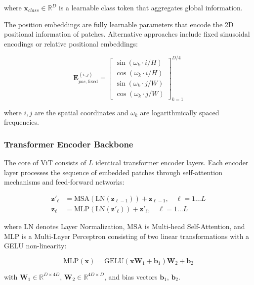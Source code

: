 where $\mathbf{x}_{class} \in \mathbb{R}^D$ is a learnable class token that aggregates global information.

The position embeddings are fully learnable parameters that encode the 2D positional information of patches. Alternative approaches include fixed sinusoidal encodings or relative positional embeddings:

\begin{equation}
\mathbf{E}^{(i,j)}_{pos, \text{fixed}} = \begin{bmatrix} \sin(\omega_k \cdot i/H) \\ \cos(\omega_k \cdot i/H) \\ \sin(\omega_k \cdot j/W) \\ \cos(\omega_k \cdot j/W) \end{bmatrix}_{k=1}^{D/4}
\end{equation}

where $i,j$ are the spatial coordinates and $\omega_k$ are logarithmically spaced frequencies.

\subsubsection{Transformer Encoder Backbone}

The core of ViT consists of $L$ identical transformer encoder layers. Each encoder layer processes the sequence of embedded patches through self-attention mechanisms and feed-forward networks:

\begin{align}
\mathbf{z}'_{\ell} &= \text{MSA}(\text{LN}(\mathbf{z}_{\ell-1})) + \mathbf{z}_{\ell-1}, \quad \ell = 1 \ldots L\\
\mathbf{z}_{\ell} &= \text{MLP}(\text{LN}(\mathbf{z}'_{\ell})) + \mathbf{z}'_{\ell}, \quad \ell = 1 \ldots L
\end{align}

where LN denotes Layer Normalization, MSA is Multi-head Self-Attention, and MLP is a Multi-Layer Perceptron consisting of two linear transformations with a GELU non-linearity:

\begin{equation}
\text{MLP}(\mathbf{x}) = \text{GELU}(\mathbf{x}\mathbf{W}_1 + \mathbf{b}_1)\mathbf{W}_2 + \mathbf{b}_2
\end{equation}

with $\mathbf{W}_1 \in \mathbb{R}^{D \times 4D}$, $\mathbf{W}_2 \in \mathbb{R}^{4D \times D}$, and bias vectors $\mathbf{b}_1$, $\mathbf{b}_2$.

